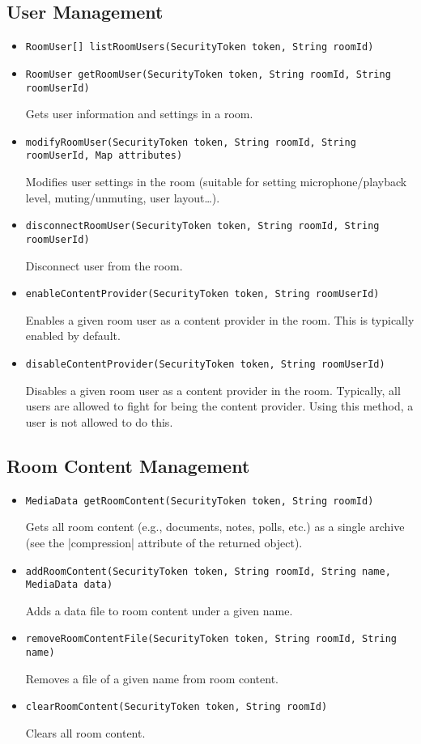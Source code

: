 \documentclass[a4paper]{report}
\newenvironment{Api}{\begin{itemize}}{\end{itemize}}
\newcommand{\ApiCode}[1]{\lstinline[style=styleApi]|#1|}
\newcommand{\ApiItem}[1]{\item #1 %

}
\newcommand{\ApiCmd}[1]{\ApiItem{\ApiCode{#1}}}
\begin{document}
\subsection{User Management}
\begin{Api}

\ApiCmd{RoomUser[] listRoomUsers(SecurityToken token, String roomId)}

\ApiCmd{RoomUser getRoomUser(SecurityToken token, String roomId, String roomUserId)}
Gets user information and settings in a room.

\ApiCmd{modifyRoomUser(SecurityToken token, String roomId, String roomUserId, Map attributes)}
Modifies user settings in the room (suitable for setting
microphone/playback level, muting/unmuting, user layout\ldots).

\ApiCmd{disconnectRoomUser(SecurityToken token, String roomId, String roomUserId)}
Disconnect user from the room.

\ApiCmd{enableContentProvider(SecurityToken token, String roomUserId)}
Enables a given room user as a content provider in the room. This is typically enabled by default.

\ApiCmd{disableContentProvider(SecurityToken token, String roomUserId)}
Disables a given room user as a content provider in the room. Typically, all users are allowed to fight for being the content provider. Using this method, a user is not allowed to do this.

\end{Api}


\subsection{Room Content Management}
\begin{Api}

\ApiCmd{MediaData getRoomContent(SecurityToken token, String roomId)}
Gets all room content (e.g., documents, notes, polls, etc.) as a single archive (see the |compression| attribute of the returned object).

\ApiCmd{addRoomContent(SecurityToken token, String roomId, String name, MediaData data)}
Adds a data file to room content under a given name.

\ApiCmd{removeRoomContentFile(SecurityToken token, String roomId, String name)}
Removes a file of a given name from room content.

\ApiCmd{clearRoomContent(SecurityToken token, String roomId)}
Clears all room content.

\end{Api}
\end{document}
